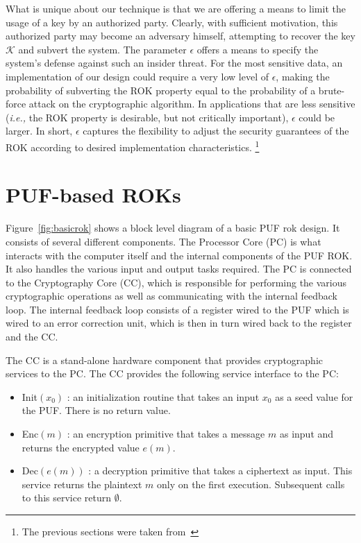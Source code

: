 What is unique about our technique is that we are offering a means to limit the usage of a key by an authorized
party.  Clearly, with sufficient motivation, this authorized party may become an adversary himself, attempting to
recover the key $\mathcal{K}$ and subvert the system.  The parameter $\epsilon$ offers a means to specify the system's
defense against such an insider threat.  For the most sensitive data, an implementation of our design could require
a very low level of $\epsilon$, making the probability of subverting the ROK property equal to the probability of
a brute-force attack on the cryptographic algorithm.  In applications that are less sensitive (\emph{i.e.,} the
ROK property is desirable, but not critically important), $\epsilon$ could be larger.  In short, $\epsilon$ captures the
flexibility to adjust the security guarantees of the ROK according to desired implementation characteristics.
\footnote{The previous sections were taken from~\cite{PUFROK}}

\section{PUF-based ROKs}
Figure~\ref{fig:basicrok} shows a block level diagram of a basic PUF rok design. It consists of several different
components. The Processor Core (PC) is what interacts with the computer itself and the internal components of the
PUF ROK. It also handles the various input and output tasks required.
 The PC is connected to the Cryptography Core (CC), which is responsible for performing the various
cryptographic operations as well as communicating with the internal feedback loop.
The internal feedback loop consists of a register wired to the PUF which is wired to an error correction unit, which
is then in turn wired back to the register and the CC.

The CC is a stand-alone hardware component that provides cryptographic services to the PC.  The CC provides the 
following service interface to the PC:
\begin{itemize}
\item {\sf Init}$(x_0)$ : an initialization routine that takes an input $x_0$ as a seed value for the PUF.  There is no return value.
\item {\sf Enc}$(m)$ : an encryption primitive that takes a message $m$ as input and returns the encrypted value $e(m)$.
\item {\sf Dec}$(e(m))$ : a decryption primitive that takes a ciphertext as input.  This service returns the plaintext $m$ only
on the first execution.  Subsequent calls to this service return $\emptyset$.
\end{itemize}

